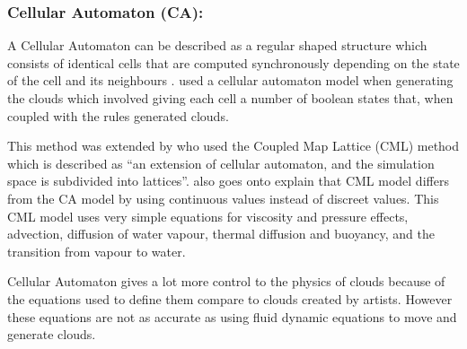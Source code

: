 \subsubsection{Cellular Automaton (CA):}
A Cellular Automaton can be described as a regular shaped structure which consists of identical cells that are computed synchronously depending on the state of the cell and its neighbours \citep{SDantchev11}.
\citet{DobashiEtAl00} used a cellular automaton model when generating the clouds which involved giving each cell a number of boolean states that, when coupled with the rules generated clouds.

This method was extended by \citet{Miyazaki01} who used the Coupled Map Lattice (CML) method which is described as “an extension of cellular automaton, and the simulation space is subdivided into lattices”.
\citet{Miyazaki01} also goes onto explain that CML model differs from the CA model by using continuous values instead of discreet values.
This CML model uses very simple equations for viscosity and pressure effects, advection, diffusion of water vapour, thermal diffusion and buoyancy, and the transition from vapour to water.

Cellular Automaton gives a lot more control to the physics of clouds because of the equations used to define them compare to clouds created by artists.
However these equations are not as accurate as using fluid dynamic equations to move and generate clouds.